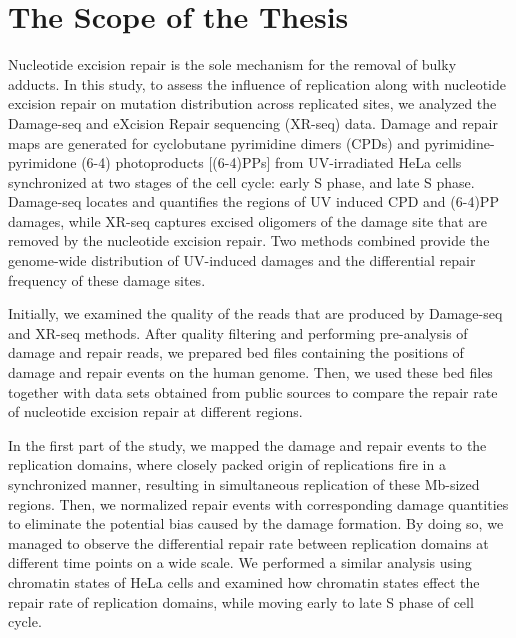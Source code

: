\setlength{\parindent}{0pt}
\chapter{\bf The Scope of the Thesis}

Nucleotide excision repair is the sole mechanism for the removal of bulky adducts. In this study, to assess the influence of replication along with nucleotide excision repair on mutation distribution across replicated sites, we analyzed the Damage-seq and eXcision Repair sequencing (XR-seq) data. Damage and repair maps are generated for cyclobutane pyrimidine dimers (CPDs) and pyrimidine-pyrimidone (6-4) photoproducts [(6-4)PPs] from UV-irradiated HeLa cells synchronized at two stages of the cell cycle: early S phase, and late S phase. Damage-seq locates and quantifies the regions of UV induced CPD and (6-4)PP damages, while XR-seq captures excised oligomers of the damage site that are removed by the nucleotide excision repair. Two methods combined provide the genome-wide distribution of UV-induced damages and the differential repair frequency of these damage sites. 

Initially, we examined the quality of the reads that are produced by Damage-seq and XR-seq methods. After quality filtering and performing pre-analysis of damage and repair reads, we prepared bed files containing the positions of damage and repair events on the human genome. Then, we used these bed files together with data sets obtained from public sources to compare the repair rate of nucleotide excision repair at different regions.

In the first part of the study, we mapped the damage and repair events to the replication domains, where closely packed origin of replications fire in a synchronized manner, resulting in simultaneous replication of these Mb-sized regions. Then, we normalized repair events with corresponding damage quantities to eliminate the potential bias caused by the damage formation. By doing so, we managed to observe the differential repair rate between replication domains at different time points on a wide scale. We performed a similar analysis using chromatin states of HeLa cells and examined how chromatin states effect the repair rate of replication domains, while moving early to late S phase of cell cycle.

